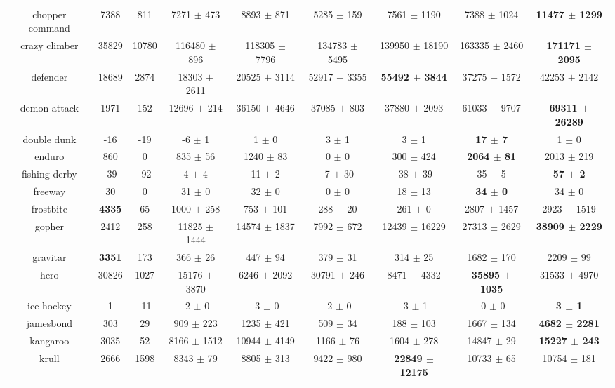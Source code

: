 \documentclass{article}
\begin{document}
\begin{table}[!ht]
\begin{tabular}{|c|c|c|c|c|c|c|c|c|}
 chopper command & 7388 & 811 & 7271 $\pm$ 473 & 8893 $\pm$ 871 & 5285 $\pm$ 159 & 7561 $\pm$ 1190 & 7388 $\pm$ 1024 & \bf{11477 $\pm$ 1299} \\
 crazy climber & 35829 & 10780 & 116480 $\pm$ 896 & 118305 $\pm$ 7796 & 134783 $\pm$ 5495 & 139950 $\pm$ 18190 & 163335 $\pm$ 2460 & \bf{171171 $\pm$ 2095} \\
 defender & 18689 & 2874 & 18303 $\pm$ 2611 & 20525 $\pm$ 3114 & 52917 $\pm$ 3355 & \bf{55492 $\pm$ 3844} & 37275 $\pm$ 1572 & 42253 $\pm$ 2142 \\
 demon attack & 1971 & 152 & 12696 $\pm$ 214 & 36150 $\pm$ 4646 & 37085 $\pm$ 803 & 37880 $\pm$ 2093 & 61033 $\pm$ 9707 & \bf{69311 $\pm$ 26289} \\
 double dunk & -16 & -19 & -6 $\pm$ 1 & 1 $\pm$ 0 & 3 $\pm$ 1 & 3 $\pm$ 1 & \bf{17 $\pm$ 7} & 1 $\pm$ 0 \\
 enduro & 860 & 0 & 835 $\pm$ 56 & 1240 $\pm$ 83 & 0 $\pm$ 0 & 300 $\pm$ 424 & \bf{2064 $\pm$ 81} & 2013 $\pm$ 219 \\
 fishing derby & -39 & -92 & 4 $\pm$ 4 & 11 $\pm$ 2 & -7 $\pm$ 30 & -38 $\pm$ 39 & 35 $\pm$ 5 & \bf{57 $\pm$ 2} \\
 freeway & 30 & 0 & 31 $\pm$ 0 & 32 $\pm$ 0 & 0 $\pm$ 0 & 18 $\pm$ 13 & \bf{34 $\pm$ 0} & 34 $\pm$ 0 \\
 frostbite & \bf{4335} & 65 & 1000 $\pm$ 258 & 753 $\pm$ 101 & 288 $\pm$ 20 & 261 $\pm$ 0 & 2807 $\pm$ 1457 & 2923 $\pm$ 1519 \\
 gopher & 2412 & 258 & 11825 $\pm$ 1444 & 14574 $\pm$ 1837 & 7992 $\pm$ 672 & 12439 $\pm$ 16229 & 27313 $\pm$ 2629 & \bf{38909 $\pm$ 2229} \\
 gravitar & \bf{3351} & 173 & 366 $\pm$ 26 & 447 $\pm$ 94 & 379 $\pm$ 31 & 314 $\pm$ 25 & 1682 $\pm$ 170 & 2209 $\pm$ 99 \\
 hero & 30826 & 1027 & 15176 $\pm$ 3870 & 6246 $\pm$ 2092 & 30791 $\pm$ 246 & 8471 $\pm$ 4332 & \bf{35895 $\pm$ 1035} & 31533 $\pm$ 4970 \\
 ice hockey & 1 & -11 & -2 $\pm$ 0 & -3 $\pm$ 0 & -2 $\pm$ 0 & -3 $\pm$ 1 & -0 $\pm$ 0 & \bf{3 $\pm$ 1} \\
 jamesbond & 303 & 29 & 909 $\pm$ 223 & 1235 $\pm$ 421 & 509 $\pm$ 34 & 188 $\pm$ 103 & 1667 $\pm$ 134 & \bf{4682 $\pm$ 2281} \\
 kangaroo & 3035 & 52 & 8166 $\pm$ 1512 & 10944 $\pm$ 4149 & 1166 $\pm$ 76 & 1604 $\pm$ 278 & 14847 $\pm$ 29 & \bf{15227 $\pm$ 243} \\
 krull & 2666 & 1598 & 8343 $\pm$ 79 & 8805 $\pm$ 313 & 9422 $\pm$ 980 & \bf{22849 $\pm$ 12175} & 10733 $\pm$ 65 & 10754 $\pm$ 181 \\

\end{tabular}
\end{table}
\end{document}
